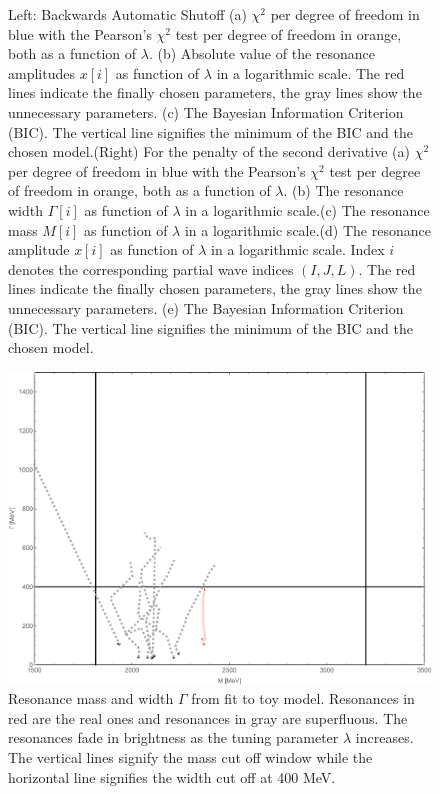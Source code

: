 \documentclass[aps, prd, twocolumn, showpacs, superscriptaddress,
preprintnumbers, nofootinbib]{revtex4-1}
\begin{document}
\begin{figure}
\begin{center}
\caption{Left: Backwards Automatic Shutoff (a) $\chi^2$ per degree of freedom in blue with the Pearson's $\chi^2$ test per degree of freedom in orange, both as a function of $\lambda$. (b) Absolute value of the resonance amplitudes $x[i]$ as function of $\lambda$ in a logarithmic scale. The red lines indicate the finally chosen parameters, the gray lines show the unnecessary parameters. (c) The Bayesian Information Criterion (BIC). The vertical line signifies the minimum of the BIC and the chosen model.(Right) For the penalty of the second derivative (a) $\chi^2$ per degree of freedom in blue with the Pearson's $\chi^2$ test per degree of freedom in orange, both as a function of $\lambda$. (b) The resonance width $\Gamma[i]$ as function of $\lambda$ in a logarithmic scale.(c) The resonance mass $M[i]$ as function of $\lambda$ in a logarithmic scale.(d) The resonance amplitude $x[i]$ as function of $\lambda$ in a logarithmic scale. Index $i$ denotes the corresponding partial wave indices $(I,J,L)$. The red lines indicate the finally chosen parameters, the gray lines show the unnecessary parameters. (e) The Bayesian Information Criterion (BIC). The vertical line signifies the minimum of the BIC and the chosen model.}
\label{fig:Fig7}
\end{center}
\end{figure}


\begin{figure}
\begin{center}
\includegraphics[width=0.99\linewidth]{Fig8B.pdf}
\caption{Resonance mass and width $\Gamma$ from fit to toy model. Resonances in red are the real ones and resonances in gray are superfluous. The resonances fade in brightness as the tuning parameter $\lambda$ increases. The vertical lines signify the mass cut off window while the horizontal line signifies the width cut off at 400 MeV.}
\label{fig:Fig8}
\end{center}
\end{figure}
\end{document}
